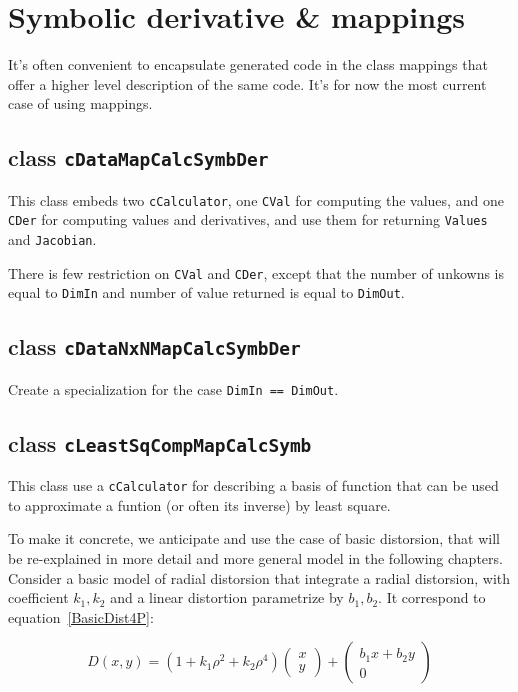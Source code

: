 
\section{Symbolic derivative \& mappings}

It's often convenient to encapsulate generated code in the class
mappings that offer a higher level description of the same code. 
It's for now the most current case of using mappings.


\subsection{class {\tt cDataMapCalcSymbDer}}

This class embeds two {\tt cCalculator}, one {\tt CVal} for computing
the values, and one {\tt CDer} for computing values and derivatives,
and use them for returning {\tt Values} and {\tt Jacobian}.

There is few restriction on  {\tt CVal} and {\tt CDer}, except that
the number of unkowns is equal to {\tt DimIn} and number of value
returned is equal to {\tt DimOut}.


\subsection{class {\tt cDataNxNMapCalcSymbDer}}

Create a specialization for the case {\tt DimIn == DimOut}.


\subsection{class {\tt cLeastSqCompMapCalcSymb}}

This class use a {\tt cCalculator} for describing a basis of function
that can be used to approximate a funtion (or often its inverse) by least square.

To make it concrete, we anticipate and use the case of basic distorsion, that will be re-explained in 
more detail and more general model in the following chapters. 
Consider a basic model of radial distorsion that integrate a radial distorsion, with
coefficient $k_1,k_2$ and a linear distortion parametrize by $b_1,b_2$. It correspond
to equation~\ref{BasicDist4P}:

\begin{equation}
	D(x,y) =  
	       (1 + k_1 \rho ^2  + k_2  \rho^4)  \begin{pmatrix} x \\ y \end{pmatrix}
	      +   \begin{pmatrix} b_1 x + b_2 y  \\  0 \end{pmatrix}
	\label{BasicDist4P}
\end{equation}

